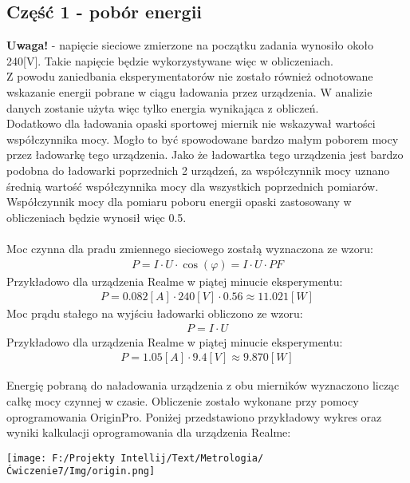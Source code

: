 \documentclass[11pt]{article}
\begin{document}
    \subsection*{Część 1 - pobór energii}
    \textbf{Uwaga!} - napięcie sieciowe zmierzone na początku zadania wynosiło około 240[V]. Takie napięcie będzie wykorzystywane więc w obliczeniach.\\
    \indent Z powodu zaniedbania eksperymentatorów nie zostało również odnotowane wskazanie energii pobrane w ciągu ładowania przez urządzenia. W analizie danych
    zostanie użyta więc tylko energia wynikająca z obliczeń. \\
    \indent Dodatkowo dla ładowania opaski sportowej miernik nie wskazywał wartości współczynnika mocy.
    Mogło to być spowodowane bardzo małym poborem mocy przez ładowarkę tego urządzenia. Jako że ładowartka tego urządzenia jest bardzo podobna
    do ładowarki poprzednich 2 urządzeń, za współczynnik mocy uznano średnią wartość współczynnika mocy dla wszystkich poprzednich pomiarów. Współczynnik
    mocy dla pomiaru poboru energii opaski zastosowany w obliczeniach będzie wynosił więc 0.5.\\
    \\
    \noindent Moc czynna dla pradu zmiennego sieciowego zostałą wyznaczona ze wzoru:
    \begin{gather*}
        P=I\cdot U\cdot \cos(\varphi)=I\cdot U\cdot PF
    \end{gather*}
    \noindent Przykładowo dla urządzenia Realme w piątej minucie eksperymentu:
    \begin{gather*}
        P=0.082[A]\cdot 240 [V]\cdot 0.56\approx 11.021[W]
    \end{gather*}
    \noindent Moc prądu stałego na wyjściu ładowarki obliczono ze wzoru:
    \begin{gather*}
        P=I\cdot U
    \end{gather*}
    \noindent Przykładowo dla urządzenia Realme w piątej minucie eksperymentu:
    \begin{gather*}
        P=1.05[A]\cdot 9.4[V]\approx 9.870[W]
    \end{gather*}
    \newpage
    \par Energię pobraną do naładowania urządzenia z obu mierników wyznaczono licząc całkę mocy czynnej w czasie. Obliczenie zostało wykonane przy pomocy
    oprogramowania OriginPro. Poniżej przedstawiono przykładowy wykres oraz wyniki kalkulacji oprogramowania dla urządzenia Realme:
    \begin{center}
        \texttt{[image: F:/Projekty Intellij/Text/Metrologia/Ćwiczenie7/Img/origin.png]}
    \end{center}
\end{document}
